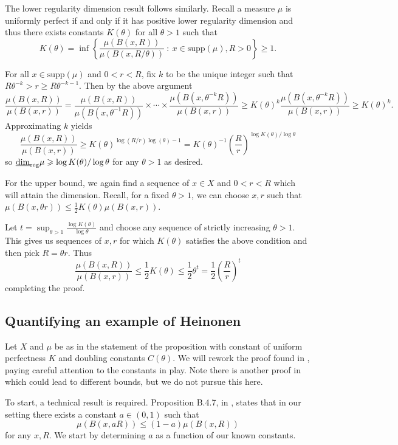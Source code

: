 The lower regularity dimension result follows similarly. Recall a measure $\mu$ is uniformly perfect if and only if it has positive lower regularity dimension and thus there exists constants $K(\theta)$ for all $\theta > 1$ such that 
\[
K(\theta) =  \inf \left\{ \frac{\mu(B(x,R))}{\mu(B(x,R/\theta))} \ : \ x \in \text{supp}(\mu), R>0 \right\} \geq 1.
\]

For all $x \in \text{supp}(\mu)$ and $0<r<R$, fix $k$ to be the unique integer such that $R \theta^{-k} > r \ge R \theta^{-k-1}$. Then by the above argument
\[
\frac{\mu(B(x,R))}{\mu(B(x,r))} = \frac{\mu(B(x,R))}{\mu(B(x,\theta^{-1}R))} \times \cdots \times \frac{\mu(B(x,\theta^{-k}R))}{\mu(B(x,r))} \ge K(\theta)^k \frac{\mu(B(x,\theta^{-k}R))}{\mu(B(x,r))} \ge K(\theta)^k.
\]
Approximating $k$ yields
\[
\frac{\mu(B(x,R))}{\mu(B(x,r))} \ge K(\theta)^{\log(R/r)\log(\theta) - 1} = K(\theta)^{-1} \left(\frac{R}{r}\right)^{\log K(\theta)/ \log \theta}
\]
so $\underline{\dim}_{\textup{reg}} \mu \geqslant \log K(\theta) / \log \theta$ for any $\theta > 1$ as desired. 

For the upper bound, we again find a sequence of $x\in X$ and $0<r<R$ which will attain the dimension. Recall, for a fixed $\theta > 1$, we can choose $x,r$ such that $\mu(B(x,\theta r)) \le \frac{1}{2}K(\theta)\mu(B(x,r))$. 

Let $t = \sup_{\theta > 1} \frac{\log K(\theta)}{\log \theta}$ and choose any sequence of strictly increasing $\theta > 1$. This gives us sequences of $x,r$ for which $K(\theta)$ satisfies the above condition and then pick $R = \theta r$. Thus
\[
\frac{\mu(B(x,R))}{\mu(B(x,r))} \le \frac{1}{2} K(\theta) \le \frac{1}{2} \theta^t = \frac{1}{2} \left(\frac{R}{r} \right)^t
\]
completing the proof.



\subsection{Quantifying an example of Heinonen}\label{ch-quantifying:sec:proof-heinonen}



Let $X$ and $\mu$ be as in the statement of the proposition with constant of uniform perfectness $K$ and doubling constants $C(\theta)$. We will rework the proof found in \cite[lemma 3.1]{anti1}, paying careful attention to the constants in play. Note there is another proof in \cite[Lemma 4.5]{eino-pablo} which could lead to different bounds, but we do not pursue this here.
	
To start, a technical result is required. Proposition B.4.7, in \cite{gromov}, states that in our setting there exists a constant $a \in (0,1)$ such that 
\[
\mu(B(x,aR)) \le (1-a) \mu(B(x,R))
\]
for any $x,R$. We start by determining $a$ as a function of our known constants. 
	
